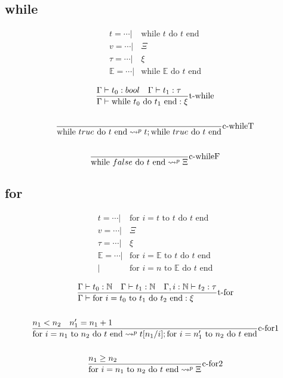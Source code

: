 \documentclass{article}
\newcommand{\st}[3][]{\ensuremath{\displaystyle\frac{#3\hfill}{#2\hfill} \text{#1}}}
\newcommand{\N}{\ensuremath \mathbb N}
\newcommand{\while}[2]{\ensuremath{\text{while }#1\text{ do }#2\text{ end}}}
\newcommand{\for}[3]{\ensuremath{\text{for }i=#1\text{ to }#2\text{ do }#3\text{ end}}}
\newcommand{\mE}[0]{\ensuremath{\mathbb{E}}}
\begin{document}
\subsection{while}
\begin{align*}
    t = \cdots |& \while{t}{t} \\
    v = \cdots |& \Xi \\
    \tau = \cdots |& \xi \\
    \mE = \cdots |& \while{\mE}{t} \\
\end{align*}
\begin{gather*}
    \st[t-while]{\Gamma\vdash \while{t_0}{t_1}: \xi }{\Gamma\vdash t_0:bool \quad \Gamma\vdash t_1:\tau} \\
    \\
    \st[c-whileT]{\while{true}{t} \leadsto^p t;\while{true}{t} }{} \\
    \\
    \st[c-whileF]{\while{false}{t} \leadsto^p \Xi }{}
\end{gather*}

\subsection{for}
\begin{align*}
    t = \cdots |& \for{t}{t}{t} \\
    v = \cdots |& \Xi \\
    \tau = \cdots |& \xi \\
    \mE = \cdots  |& \for{\mE}{t}{t} \\
                  |& \for{n}{\mE}{t} \\
\end{align*}
\begin{gather*}
    \st[t-for]{\Gamma\vdash \for{t_0}{t_1}{t_2}: \xi }{\Gamma\vdash t_0:\N \quad \Gamma\vdash t_1:\N \quad \Gamma,i:\N\vdash t_2:\tau} \\
    \\
    \st[c-for1]{
        \for{n_1}{n_2}{t} \leadsto^p t[n_1/i];\for{n_1'}{n_2}{t}
    }{
        n_1<n_2
        \quad
        n_1' = n_1+1
    } \\
    \\
    \st[c-for2]{
        \for{n_1}{n_2}{t} \leadsto^p \Xi
    }{
        n_1\geq n_2
    } \\
\end{gather*}
\end{document}
